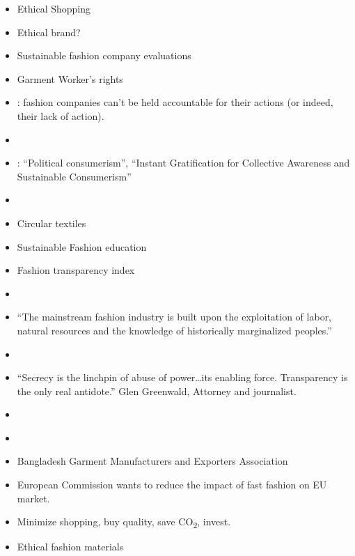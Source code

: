 \documentclass[
  letterpaper,
  DIV=11,
  numbers=noendperiod]{scrartcl}
\begin{document}
\begin{itemize}
\item
  \citet{TransparencySustainabilityPlatform2023} Ethical Shopping
\item
  \citet{SheepIncSoftcore2023} Ethical brand?
\item
  \citet{goodonyouGoodYouSustainable2023} Sustainable fashion company
  evaluations
\item
  \citet{LilyMindfulActive} Garment Worker's rights
\item
  \citet{emilychanWillFashionIndustry2022}: fashion companies can't be
  held accountable for their actions (or indeed, their lack of action).
\item
  \citet{wikirateWikiRate2023}
\item
  \citet{InstantGratificationCollective2022}: ``Political consumerism'',
  ``Instant Gratification for Collective Awareness and Sustainable
  Consumerism''
\item
  \citet{fashioncheckerFashionCheckerWagesTransparency2023}
\item
  \citet{eestidisainikeskusiestoniandesigncentreCircularDesignHOW2021}
  Circular textiles
\item
  \citet{eestikunstiakadeemiaEKAArendasEuroopa2022} Sustainable Fashion
  education
\item
  \citet{fashionrevolutionfoundationFASHIONTRANSPARENCYINDEX2022}
  Fashion transparency index
\item
  \citet{CleanClothesCampaign}
\item
  ``The mainstream fashion industry is built upon the exploitation of
  labor, natural resources and the knowledge of historically
  marginalized peoples.''
\item
  \citet{TextileGenesis}
\item
  ``Secrecy is the linchpin of abuse of power\ldots its enabling force.
  Transparency is the only real antidote.'' Glen Greenwald, Attorney and
  journalist.
\item
  \citet{stand.earthStandEarthPeople2023}
\item
  \citet{NewStandardInstitute}
\item
  \citet{BGMEAHome} Bangladesh Garment Manufacturers and Exporters
  Association
\item
  \citet{errKomisjonTahabVahendada2022} European Commission wants to
  reduce the impact of fast fashion on EU market.
\item
  Minimize shopping, buy quality, save CO\textsubscript{2}, invest.
\item
  \citet{textileexchangeTextileExchange2023} Ethical fashion materials

\end{itemize}
\end{document}
